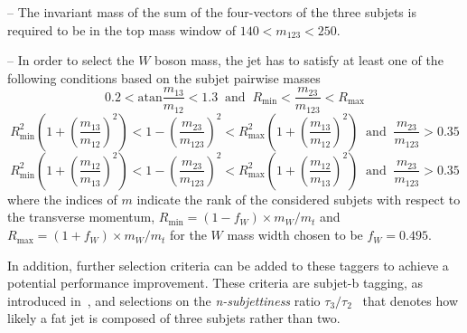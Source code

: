 \begin{description}
\begin{description}
 \item -- The invariant mass of the sum of the four-vectors of the three subjets is required to be in the top mass window of $140 < m_{\mathrm{123}} < 250$\gev.
 \item -- In order to select the $W$ boson mass, the jet has to satisfy at least one of the following conditions based on the subjet pairwise masses
 \begin{equation}
0.2 < \mathrm{atan} \frac{m_{\mathrm{13}}}{m_{\mathrm{12}}} < 1.3 \; \; \mathrm{and} \; \; R_{\mathrm{min}} < \frac{m_{\mathrm{23}}}{m_{\mathrm{123}}} < R_{\mathrm{max}} 
\label{eq:hep_1}
 \end{equation}
 \begin{equation}
 R^2_{\mathrm{min}} \left( 1+ \left(\frac{m_{\mathrm{13}}}{m_{\mathrm{12}}}\right)^2 \right)  < 1 - \left( \frac{m_{\mathrm{23}}}{m_{\mathrm{123}}} \right)^2  < R^2_{\mathrm{max}} \left( 1+\left(\frac{m_{\mathrm{13}}}{m_{\mathrm{12}}} \right)^2 \right) \; \; \mathrm{and} \; \; \frac{m_{\mathrm{23}}}{m_{\mathrm{123}}} > 0.35 
\label{eq:hep_2}
\end{equation}
\begin{equation}
 R^2_{\mathrm{min}} \left( 1+ \left(\frac{m_{\mathrm{12}}}{m_{\mathrm{13}}} \right)^2 \right)  < 1 - \left(\frac{m_{\mathrm{23}}}{m_{\mathrm{123}}}\right)^2 < R^2_{\mathrm{max}}\left(1+ \left(\frac{m_{\mathrm{12}}}{m_{\mathrm{13}}} \right)^2 \right) \; \; \mathrm{and} \; \; \frac{m_{\mathrm{23}}}{m_{\mathrm{123}}} > 0.35 
\label{eq:hep_3}
\end{equation}
where the indices of $m$ indicate the rank of the considered subjets with respect to the transverse momentum, $R_{\mathrm{min}} = (1 - f_{W}) \times m_W/m_t$ and $R_{\mathrm{max}} = (1 + f_{W}) \times m_W/m_t$ for the $W$ mass width chosen to be $f_W = 0.495$.  
\end{description}
\end{description}
In addition, further selection criteria can be added to these taggers to achieve a potential performance improvement. These criteria are subjet-b tagging, as introduced in~\cite{CMS-PAS-BTV-13-001}, and selections on the \textit{n-subjettiness} ratio $\tau_3/\tau_2$~\cite{Thaler:2010tr, Thaler:2011gf} that denotes how likely a fat jet is composed of three subjets rather than two. \\
